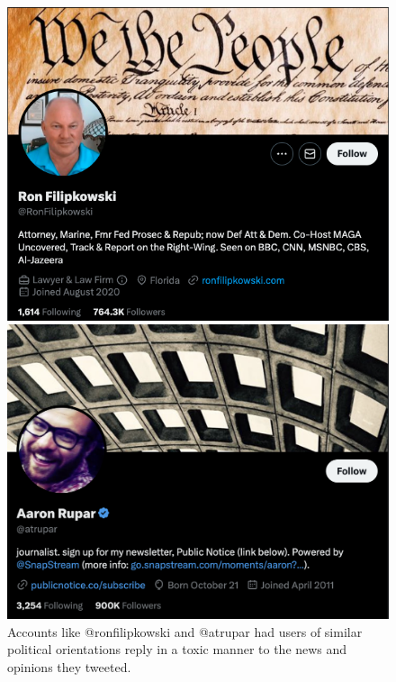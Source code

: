 \begin{figure}
\begin{minipage}[l]{0.45\textwidth}
\includegraphics[width=1\columnwidth]{figures/ron.png}
\end{minipage}
\begin{minipage}[l]{0.45\textwidth}
\includegraphics[width=1\columnwidth]{figures/atrupar.png} 
\end{minipage}

\begin{minipage}[l]{1\textwidth}
\caption{Accounts like @ronfilipkowski and @atrupar had users of similar political orientations reply in a toxic manner to the news and opinions they tweeted.\label{fig:orientation-bio}}
\end{minipage}

\end{figure}



